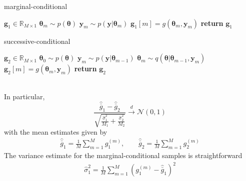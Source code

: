 \documentclass{article}
\begin{document}
\begin{minipage}{0.46\textwidth}
\begin{algorithm}[H]
    \centering
    \caption{marginal-conditional}\label{alg:mc-sampler}
    \begin{algorithmic}[1]
        \State {} $\mathbf{g}_{1} \in \mathbb{R}_{M\times 1}$
            \State $\mathbf{\theta}_{m} \sim p(\mathbf{\theta})$ 
            \State $\mathbf{y}_{m} \sim p(\mathbf{y}|\mathbf{\theta}_{m})$ 
            \State $\mathbf{g}_{1}[m] = g(\mathbf{\theta}_{m}, \mathbf{y}_{m})$ 
        \EndFor        
        \State \textbf{return} $\mathbf{g}_{1}$
    \end{algorithmic}
\end{algorithm}
\end{minipage}
\hfill
\begin{minipage}{0.46\textwidth}
\begin{algorithm}[H]
    \centering
    \caption{successive-conditional}\label{alg:sc-sampler}
    \begin{algorithmic}[1]
        \State {} $\mathbf{g}_{2} \in \mathbb{R}_{M\times 1}$
        \State $\mathbf{\theta}_{0} \sim p(\mathbf{\theta})$ 
            \State $\mathbf{y}_{m} \sim p(\mathbf{y}|\mathbf{\theta}_{m-1})$ 
            \State $\mathbf{\theta}_{m} \sim q(\mathbf{\theta}|\mathbf{\theta}_{m-1}, \mathbf{y}_{m})$ 
            \State $\mathbf{g}_{2}[m] = g(\mathbf{\theta}_{m}, \mathbf{y}_{m})$ 
        \EndFor        
        \State \textbf{return} $\mathbf{g}_{2}$
    \end{algorithmic}
\end{algorithm}
\end{minipage}
\\
In particular, 
\begin{equation}
    \frac{\hat{\bar{g}}_{1} - \hat{\bar{g}}_{2}}{\sqrt{ \frac{\hat{\sigma}^{2}_{1}}{M_{1}} + \frac{\hat{\sigma}^{2}_{2}}{M_{2}}}} \xrightarrow[]{d} \mathcal{N}(0, 1)
\end{equation}
with the mean estimates given by
\begin{align*}
    \hat{\bar{g}}_{1} = \frac{1}{M}\sum_{m=1}^{M}g_{1}^{(m)}, \qquad \hat{\bar{g}}_{2} = \frac{1}{M}\sum_{m=1}^{M}g_{2}^{(m)}
\end{align*}
The variance estimate for the marginal-conditional samples is straightforward
\begin{align*}
    \hat{\sigma}_{1}^{2} = \frac{1}{M}\sum_{m=1}^{M}(g_{1}^{(m)} - \hat{\bar{g}}_{1})^{2}
\end{align*}
\end{document}
